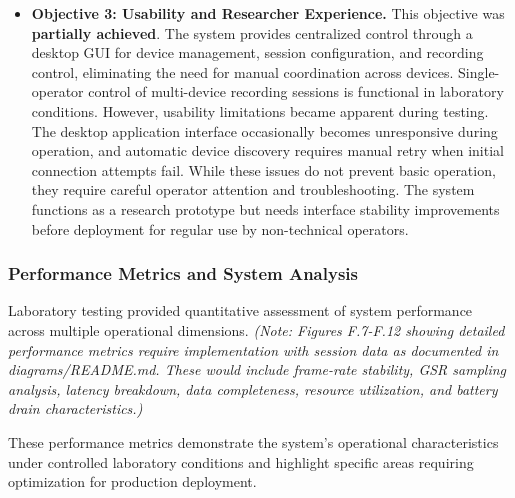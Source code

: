 \documentclass[12pt,a4paper]{article}
\begin{document}
\begin{itemize}
\tightlist
\item
  \textbf{Objective 3: Usability and Researcher Experience.} This objective was \textbf{partially achieved}. The system provides centralized control through a desktop GUI for device management, session configuration, and recording control, eliminating the need for manual coordination across devices. Single-operator control of multi-device recording sessions is functional in laboratory conditions. However, usability limitations became apparent during testing. The desktop application interface occasionally becomes unresponsive during operation, and automatic device discovery requires manual retry when initial connection attempts fail. While these issues do not prevent basic operation, they require careful operator attention and troubleshooting. The system functions as a research prototype but needs interface stability improvements before deployment for regular use by non-technical operators.
\end{itemize}

\subsubsection{Performance Metrics and System Analysis}\label{performance-metrics-and-system-analysis}

Laboratory testing provided quantitative assessment of system performance across multiple operational dimensions. \emph{(Note: Figures F.7-F.12 showing detailed performance metrics require implementation with session data as documented in diagrams/README.md. These would include frame-rate stability, GSR sampling analysis, latency breakdown, data completeness, resource utilization, and battery drain characteristics.)}

These performance metrics demonstrate the system's operational characteristics under controlled laboratory conditions and highlight specific areas requiring optimization for production deployment.
\end{document}
